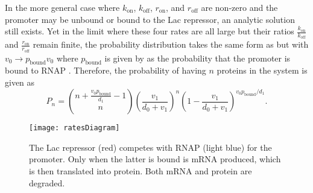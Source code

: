 In the more general case where $k_\text{on}$, $k_\text{off}$, $r_\text{on}$, and
$r_\text{off}$ are non-zero and the promoter may be unbound or bound to the Lac
repressor, an analytic solution still exists. Yet in the limit where these four
rates are all large but their ratios $\frac{k_\text{on}}{k_\text{off}}$ and
$\frac{r_\text{on}}{r_\text{off}}$ remain finite, the probability distribution
takes the same form as \eref[eqGeneExpressionDistributionConstitutive] but with
$v_0 \to p_\text{bound} v_0$ where $p_\text{bound}$ is given by
\eref[eqRNAPboundEquilibrium] as the probability that the promoter is bound to
RNAP \cite{Shahrezaei2008}. Therefore, the probability of having $n$ proteins in
the system is given as
\begin{equation} \label{eqGeneExpressionDistributionFastRates}
P_n = \binom{n + \frac{v_0 p_\text{bound}}{d_1} - 1}{n} \left( \frac{v_1}{d_0 + v_1} \right)^{n} \left( 1 - \frac{v_1}{d_0 + v_1} \right)^{v_0 p_\text{bound}/d_1}.
\end{equation}

\begin{figure}[h!]
	\centering \texttt{[image: ratesDiagram]} 
	\caption{ The Lac repressor (red) competes with RNAP (light blue) for the promoter. Only when the latter is bound is mRNA produced, which is then translated into protein. Both mRNA and protein are degraded.}
	\label{figRatesDiagram}
\end{figure}